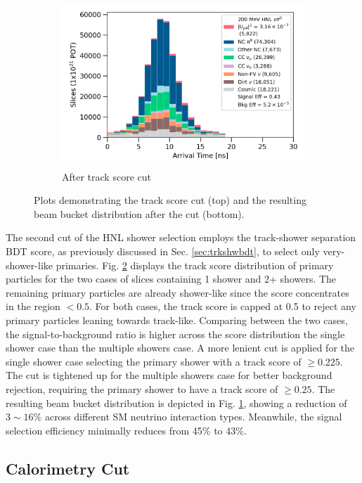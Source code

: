 \begin{figure}[b!]
\begin{subfigure}[b]{0.495\textwidth}
            \includegraphics[width=\textwidth]{beam_bucket_postrackscore}
            \caption{After track score cut}%
	    \label{fig:bb_track_score}
        \end{subfigure}
        \caption{
		Plots demonstrating the track score cut (top) and the resulting beam bucket distribution after the cut (bottom). 
	}
        \label{fig:track_score_cut}
\end{figure}

The second cut of the HNL shower selection employs the track-shower separation BDT score, as previously discussed in Sec. \ref{sec:trkshwbdt}, to select only very-shower-like primaries.
Fig. \ref{fig:track_score_cut} displays the track score distribution of primary particles for the two cases of slices containing 1 shower and 2+ showers.
The remaining primary particles are already shower-like since the score concentrates in the region $< 0.5$.
For both cases, the track score is capped at 0.5 to reject any primary particles leaning towards track-like.
Comparing between the two cases, the signal-to-background ratio is higher across the score distribution the single shower case than the multiple showers case.
A more lenient cut is applied for the single shower case selecting the primary shower with a track score of $\geq 0.225$.
The cut is tightened up for the multiple showers case for better background rejection, requiring the primary shower to have a track score of $\geq 0.25$.
The resulting beam bucket distribution is depicted in Fig. \ref{fig:bb_track_score}, showing a reduction of $3\sim16\%$ across different SM neutrino interaction types.
Meanwhile, the signal selection efficiency minimally reduces from 45\% to 43\%.

\subsection{Calorimetry Cut}

